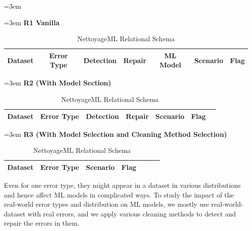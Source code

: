 \begin{table}[H]	
	\leftskip=3em
	\begin{flushleft}
		\leftskip=3em
		\textbf{R1 Vanilla}
	\end{flushleft}
	\begin{tabular}{|c|c|c|c|c|c|c|}
		\hline 
		Dataset & Error Type & Detection & Repair & ML Model & Scenario & Flag \\ 
		\hline 
	\end{tabular} \linebreak	

	\begin{flushleft}
		\leftskip=3em
		\textbf{R2 (With Model Section)}
	\end{flushleft}
	\begin{tabular}{|c|c|c|c|c|c|c|}
		\hline 
		Dataset & Error Type & Detection & Repair & Scenario & Flag \\ 
		\hline 
	\end{tabular} \linebreak

	\begin{flushleft}
		\leftskip=3em
		\textbf{R3 (With Model Selection and Cleaning Method Selection)}
	\end{flushleft}	

	\begin{tabular}{|c|c|c|c|c|c|c|}
		\hline 
		Dataset & Error Type & Scenario & Flag \\ 
		\hline 
	\end{tabular} \linebreak
	\caption{NettoyageML Relational Schema}
	\label{table:nettoyage_ml}
\end{table}

Even for one error type, they might appear in a dataset in various distributions and hence affect ML models in complicated ways. To study the impact of the real-world error types and distribution on ML models, we mostly use real-world-dataset with real errors, and we apply various cleaning methods to detect and repair the errors in them.


